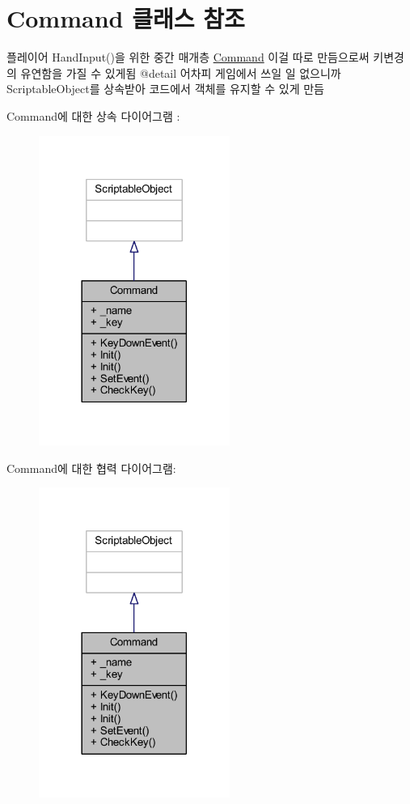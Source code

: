 \hypertarget{class_command}{}\section{Command 클래스 참조}
\label{class_command}


플레이어 Hand\+Input()을 위한 중간 매개층 \mbox{\hyperlink{class_command}{Command}} 이걸 따로 만듬으로써 키변경의 유연함을 가질 수 있게됨 @detail 어차피 게임에서 쓰일 일 없으니까 Scriptable\+Object를 상속받아 코드에서 객체를 유지할 수 있게 만듬  




Command에 대한 상속 다이어그램 \+: 
\nopagebreak
\begin{figure}[H]
\begin{center}
\leavevmode
\includegraphics[width=177pt]{d8/ddd/class_command__inherit__graph}
\end{center}
\end{figure}


Command에 대한 협력 다이어그램\+:
\nopagebreak
\begin{figure}[H]
\begin{center}
\leavevmode
\includegraphics[width=177pt]{db/dd2/class_command__coll__graph}
\end{center}
\end{figure}
